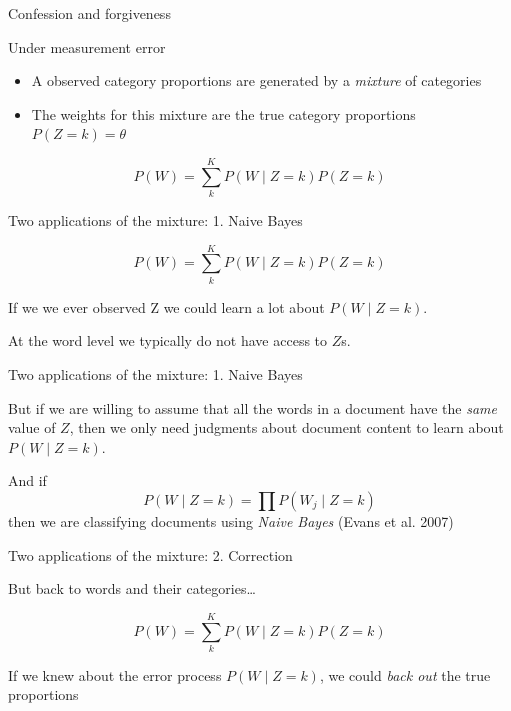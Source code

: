 \documentclass{hertieteaching}
\begin{document}

\begin{frame}{Confession and forgiveness}
\protect\hypertarget{confession-and-forgiveness}{}

Under measurement error

\begin{itemize}
\tightlist
\item
  A observed category proportions are generated by a \emph{mixture} of
  categories
\item
  The weights for this mixture are the true category proportions
  \(P(Z=k) = \theta\)
\end{itemize}

\[
P(W) = \sum^K_k {P(W \mid Z=k)} P(Z=k)
\]

\end{frame}

\begin{frame}{Two applications of the mixture: 1. Naive Bayes}
\protect\hypertarget{two-applications-of-the-mixture-1.-naive-bayes}{}

\[
P(W) = \sum^K_k {P(W \mid Z=k)} P(Z=k)
\]

If we we ever observed Z we could learn a lot about \(P(W \mid Z=k)\).

\pause

At the word level we typically do not have access to \(Z\)s.

\end{frame}

\begin{frame}{Two applications of the mixture: 1. Naive Bayes}
\protect\hypertarget{two-applications-of-the-mixture-1.-naive-bayes-1}{}

But if we are willing to assume that all the words in a document have
the \emph{same} value of \(Z\), then we only need judgments about
document content to learn about \(P(W \mid Z=k)\).

And if \[
P(W \mid Z=k) = \prod P(W_j \mid Z=k)
\] then we are classifying documents using \emph{Naive Bayes} (Evans et
al. 2007)

\end{frame}

\begin{frame}{Two applications of the mixture: 2. Correction}
\protect\hypertarget{two-applications-of-the-mixture-2.-correction}{}

But back to words and their categories\ldots{}

\[
P(W) = \sum^K_k {P(W \mid Z=k)} P(Z=k)
\]

If we knew about the error process \(P(W \mid Z=k)\), we could
\emph{back out} the true proportions

\end{frame}
\end{document}
